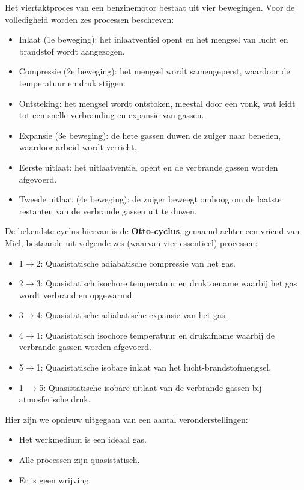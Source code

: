 Het viertaktproces van een benzinemotor bestaat uit vier bewegingen. Voor de volledigheid worden zes processen beschreven:
\begin{itemize}
    \item Inlaat (1e beweging): het inlaatventiel opent en het mengsel van lucht en brandstof wordt aangezogen.
    \item Compressie (2e beweging): het mengsel wordt samengeperst, waardoor de temperatuur en druk stijgen.
    \item Ontsteking: het mengsel wordt ontstoken, meestal door een vonk, wat leidt tot een snelle verbranding en expansie van gassen.
    \item Expansie (3e beweging): de hete gassen duwen de zuiger naar beneden, waardoor arbeid wordt verricht.
    \item Eerste uitlaat: het uitlaatventiel opent en de verbrande gassen worden afgevoerd.
    \item Tweede uitlaat (4e beweging): de zuiger beweegt omhoog om de laatste restanten van de verbrande gassen uit te duwen.
\end{itemize}

De bekendste cyclus hiervan is de \textbf{Otto-cyclus}, genaamd achter een vriend van Miel, bestaande uit volgende zes (waarvan vier essentieel) processen:
\begin{itemize}
    \item 1\(\to\)2: Quasistatische adiabatische compressie van het gas.
    \item 2\(\to\)3: Quasistatisch isochore temperatuur en druktoename waarbij het gas wordt verbrand en opgewarmd.
    \item 3\(\to\)4: Quasistatische adiabatische expansie van het gas.
    \item 4\(\to\)1: Quasistatisch isochore temperatuur en drukafname waarbij de verbrande gassen worden afgevoerd.
    \item 5\(\to\)1: Quasistatische isobare inlaat van het lucht-brandstofmengsel.
    \item 1 \(\to\)5: Quasistatische isobare uitlaat van de verbrande gassen bij atmosferische druk.
\end{itemize}

Hier zijn we opnieuw uitgegaan van een aantal veronderstellingen:
\begin{itemize}
    \item Het werkmedium is een ideaal gas.
    \item Alle processen zijn quasistatisch.
    \item Er is geen wrijving.
\end{itemize}

